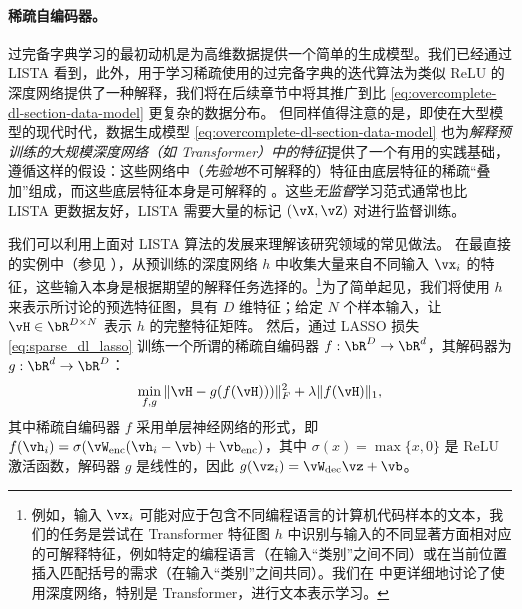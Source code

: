 \documentclass[../../book-main_zh.tex]{subfiles}
\begin{document}



\paragraph{稀疏自编码器。}
过完备字典学习的最初动机是为高维数据提供一个简单的生成模型。我们已经通过 LISTA 看到，此外，用于学习稀疏使用的过完备字典的迭代算法为类似 ReLU 的深度网络提供了一种解释，我们将在后续章节中将其推广到比 \eqref{eq:overcomplete-dl-section-data-model} 更复杂的数据分布。
但同样值得注意的是，即使在大型模型的现代时代，数据生成模型 \eqref{eq:overcomplete-dl-section-data-model} 也为\textit{解释预训练的大规模深度网络（如 Transformer）中的特征}提供了一个有用的实践基础，遵循这样的假设：这些网络中（\textit{先验地}不可解释的）特征由底层特征的稀疏“叠加”组成，而这些底层特征本身是可解释的 \cite{elhage2022superposition}。这些\textit{无监督}学习范式通常也比 LISTA 更数据友好，LISTA 需要大量的标记 $(\vX, \vZ)$ 对进行监督训练。

我们可以利用上面对 LISTA 算法的发展来理解该研究领域的常见做法。
在最直接的实例中（参见 \citep{huben2024sparse, gao2025scaling}），从预训练的深度网络 $h$ 中收集大量来自不同输入 $\vx_i$ 的特征，这些输入本身是根据期望的解释任务选择的。\footnote{例如，输入 $\vx_i$ 可能对应于包含不同编程语言的计算机代码样本的文本，我们的任务是尝试在 Transformer 特征图 $h$ 中识别与输入的不同显著方面相对应的可解释特征，例如特定的编程语言（在输入“类别”之间不同）或在当前位置插入匹配括号的需求（在输入“类别”之间共同）。我们在  中更详细地讨论了使用深度网络，特别是 Transformer，进行文本表示学习。}为了简单起见，我们将使用 $h$ 来表示所讨论的预选特征图，具有 $D$ 维特征；给定 $N$ 个样本输入，让 $\vH \in \bR^{D \times N}$ 表示 $h$ 的完整特征矩阵。
然后，通过 LASSO 损失 \eqref{eq:sparse_dl_lasso} 训练一个所谓的稀疏自编码器 $f : \bR^D \to \bR^d$，其解码器为 $g : \bR^d \to \bR^D$：
\begin{equation}\label{eq:sae-loss}
  \min_{f, g} \| \vH - g(f(\vH))) \|_F^2 + \lambda \|f(\vH)\|_1 ,
\end{equation}
其中稀疏自编码器 $f$ 采用单层神经网络的形式，即 $f(\vh_i) = \sigma(\vW_{\mathrm{enc}}(\vh_i - \vb) + \vb_{\mathrm{enc}})$，其中 $\sigma(x) = \max \{x, 0\}$ 是 ReLU 激活函数，解码器 $g$ 是线性的，因此 $g(\vz_i) = \vW_{\mathrm{dec}}\vz + \vb$。
\end{document}
